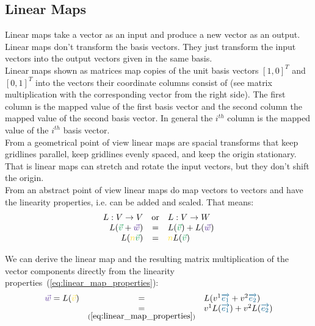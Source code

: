 \subsection{Linear Maps}

Linear maps take a vector as an input and produce a new vector as an output. Linear maps
don't transform the basis vectors. They just transform the input vectors into the output
vectors given in the same basis.\\

Linear maps shown as matrices map copies of the unit basis vectors $[1,0]^T$ and $[0,1]^T$
into the vectors their coordinate columns consist of (see matrix multiplication with the
corresponding vector from the right side). The first column is the mapped value of the
first basis vector and the second column the mapped value of the second basis vector. In
general the $i^{th}$ column is the mapped value of the $i^{th}$ basis vector.\\

From a geometrical point of view linear maps are spacial transforms that keep gridlines
parallel, keep gridlines evenly spaced, and keep the origin stationary. That is linear
maps can stretch and rotate the input vectors, but they don't shift the origin.\\

From an abstract point of view linear maps do map vectors to vectors and have the
linearity properties, i.e. can be added and scaled. That means:
\begin{equation}
    \label{eq:linear_map_properties}
    \begin{array}{rcl}
        L: V \rightarrow  V &\text{or}& L: V \rightarrow W \\
        L(\textcolor{ForestGreen}{\vec{v}} + \textcolor{RoyalPurple}{\vec{w}}) & = &
        L(\textcolor{ForestGreen}{\vec{v}}) + L(\textcolor{RoyalPurple}{\vec{w}}) \\
        L(\textcolor{Goldenrod}{n}\textcolor{ForestGreen}{\vec{v}}) & = &
        \textcolor{Goldenrod}{n}L(\textcolor{ForestGreen}{\vec{v}}) 
    \end{array}
\end{equation}

We can derive the linear map and the resulting matrix multiplication of the vector
components directly from the linearity properties~(\ref{eq:linear_map_properties}):
\begin{equation}
    \label{eq:linear_map_derive_matrix_multiplication}
    \begin{array}{rcl}
        \textcolor{RoyalPurple}{\vec{w}} = L(\textcolor{Goldenrod}{\vec{v}}) & = &
        L(\hdvc{1}\hdbv{1} + \hdvc{2}\hdbv{2}) \\
        & \underset{(\ref{eq:linear_map_properties})}{=} &
        \hdvc{1}L(\hdbv{1}) + \hdvc{2}L(\hdbv{2})
    \end{array}
\end{equation}


